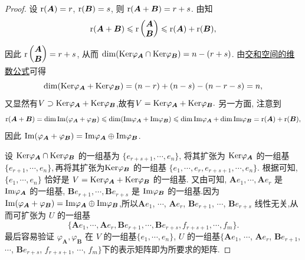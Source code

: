 \documentclass[../../main.tex]{subfiles}%
\begin{document}
\begin{proof}
设 ${\rm r}(\boldsymbol{A}) = r$, ${\rm r}(\boldsymbol{B}) = s$, 则 ${\rm r}(\boldsymbol{A} + \boldsymbol{B}) = r + s$. 由知
$$
{\rm r}(\boldsymbol{A} + \boldsymbol{B}) \leqslant {\rm r}\begin{pmatrix}
\boldsymbol{A} \\
\boldsymbol{B}
\end{pmatrix} \leqslant {\rm r}(\boldsymbol{A}) + {\rm r}(\boldsymbol{B}),$$
因此 ${\rm r}\begin{pmatrix}
\boldsymbol{A} \\
\boldsymbol{B}
\end{pmatrix} = r + s$, 从而 $\dim({\rm Ker}\varphi_{\boldsymbol{A}} \cap {\rm Ker}\varphi_{\boldsymbol{B}}) = n - (r + s)$. 由\hyperref[theorem:交和空间维数公式]{交和空间的维数公式}可得 
$$\dim({\rm Ker}\varphi_{\boldsymbol{A}} + {\rm Ker}\varphi_{\boldsymbol{B}}) = (n - r) + (n - s) - (n - r - s) = n,$$
又显然有$V\supset  {\rm Ker}\varphi_{\boldsymbol{A}} + {\rm Ker}\varphi_{\boldsymbol{B}}$,故有$V = {\rm Ker}\varphi_{\boldsymbol{A}} + {\rm Ker}\varphi_{\boldsymbol{B}}.$
另一方面, 注意到 
$${\rm r}(\boldsymbol{A} + \boldsymbol{B}) = \dim{\rm Im}(\varphi_{\boldsymbol{A}} + \varphi_{\boldsymbol{B}}) \leqslant \dim({\rm Im}\varphi_{\boldsymbol{A}} + {\rm Im}\varphi_{\boldsymbol{B}}) \leqslant \dim{\rm Im}\varphi_{\boldsymbol{A}} + \dim{\rm Im}\varphi_{\boldsymbol{B}} = {\rm r}(\boldsymbol{A}) + {\rm r}(\boldsymbol{B}),$$
因此 ${\rm Im}(\varphi_{\boldsymbol{A}} + \varphi_{\boldsymbol{B}}) = {\rm Im}\varphi_{\boldsymbol{A}} \oplus {\rm Im}\varphi_{\boldsymbol{B}}$. 

设 ${\rm Ker}\varphi_{\boldsymbol{A}} \cap {\rm Ker}\varphi_{\boldsymbol{B}}$ 的一组基为 $\{e_{r + s + 1}, \cdots, e_n\}$, 将其扩张为 ${\rm Ker}\varphi_{\boldsymbol{A}}$ 的一组基 $\{e_{r + 1},\cdots, e_n\},$再将其扩张为${\rm Ker}\varphi_{\boldsymbol{B}}$ 的一组基 $\{e_1,\cdots,e_r,e_{r+s+1},\cdots, e_n\}.$
根据可知, $\{e_1, \cdots, e_n\}$ 恰好是 $V = {\rm Ker}\varphi_{\boldsymbol{A}} + {\rm Ker}\varphi_{\boldsymbol{B}}$ 的一组基. 又由可知, $\boldsymbol{A}e_1, \cdots, \boldsymbol{A}e_r$ 是 ${\rm Im}\varphi_{\boldsymbol{A}}$ 的一组基, $\boldsymbol{B}e_{r + 1}, \cdots, \boldsymbol{B}e_{r + s}$ 是 ${\rm Im}\varphi_{\boldsymbol{B}}$ 的一组基.因为${\rm Im}(\varphi_{\boldsymbol{A}} + \varphi_{\boldsymbol{B}}) = {\rm Im}\varphi_{\boldsymbol{A}} \oplus {\rm Im}\varphi_{\boldsymbol{B}}$,所以$\boldsymbol{A}e_1$, $\cdots$, $\boldsymbol{A}e_r$, $\boldsymbol{B}e_{r + 1}$, $\cdots$, $\boldsymbol{B}e_{r + s}$ 线性无关,从而可扩张为 $U$ 的一组基 $$\{\boldsymbol{A}e_1,\cdots,\boldsymbol{A}e_r,\boldsymbol{B}e_{r + 1},\cdots, \boldsymbol{B}e_{r + s}, f_{r + s + 1}, \cdots, f_m\}.$$ 最后容易验证 $\varphi_{\boldsymbol{A}}, \varphi_{\boldsymbol{B}}$ 在 $V$ 的一组基$\{e_1, \cdots, e_n\}$, $U$ 的一组基$\{\boldsymbol{A}e_1$, $\cdots$, $\boldsymbol{A}e_r$, $\boldsymbol{B}e_{r + 1}$, $\cdots$, $\boldsymbol{B}e_{r + s}$, $f_{r + s + 1}$, $\cdots$, $f_m\}$下的表示矩阵即为所要求的矩阵.

\end{proof}
\end{document}
